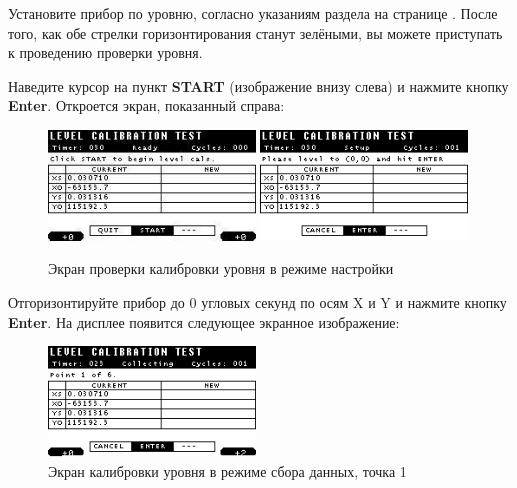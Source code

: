 Установите прибор \cg{} по уровню, согласно указаниям раздела
 на странице
\pageref{subsec:leveling_the_cg6_autograv}. После того, как обе стрелки
горизонтирования станут зелёными, вы можете приступать к проведению проверки
уровня.

Наведите курсор на пункт \textbf{START} (изображение внизу слева) и нажмите кнопку
\textbf{Enter}. Откроется экран, показанный справа:

\begin{figure}[H]
  \centering
  \includegraphics[width=0.49\textwidth]{figures/the_level_calibration_test_screen_in_setup_mode_1}
  \includegraphics[width=0.49\textwidth]{figures/the_level_calibration_test_screen_in_setup_mode_2}
  \caption{Экран проверки калибровки уровня в режиме настройки}
  \label{fig:the_level_calibration_test_screen_in_setup_mode}
\end{figure}

Отгоризонтируйте прибор \cg{} до 0 угловых секунд по осям X и Y и нажмите
кнопку \textbf{Enter}. На дисплее появится следующее экранное изображение:

\newpage
\begin{figure}[H]
  \centering
  \includegraphics[width=0.49\textwidth]{figures/the_level_calibration_test_screen_in_collecting_mode_point_1}
  \caption{Экран калибровки уровня в режиме сбора данных, точка 1}
  \label{fig:the_level_calibration_test_screen_in_collecting_mode_point_1}
\end{figure}

